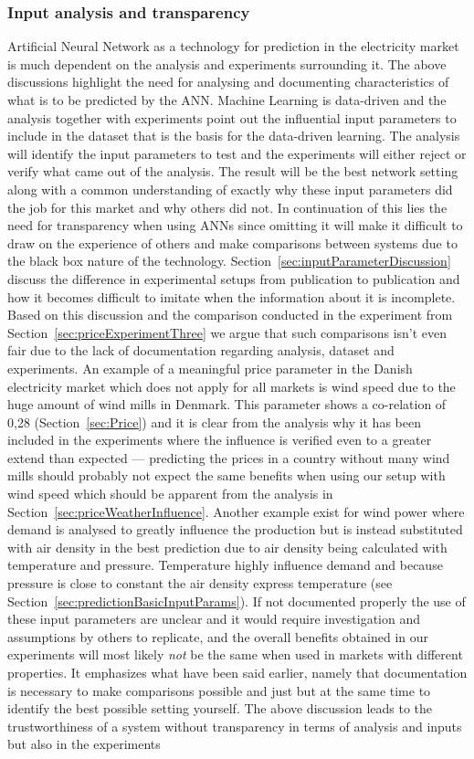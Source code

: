 \subsubsection{Input analysis and transparency}
Artificial Neural Network as a technology for prediction in the electricity market is much dependent on the analysis and experiments surrounding it. The above discussions highlight the need for analysing and documenting characteristics of what is to be predicted by the ANN. Machine Learning is data-driven\cite{18} and the analysis together with experiments point out the influential input parameters to include in the dataset that is the basis for the data-driven learning. The analysis will identify the input parameters to test and the experiments will either reject or verify what came out of the analysis. The result will be the best network setting along with a common understanding of exactly why these input parameters did the job for this market and why others did not. In continuation of this lies the need for transparency when using ANNs since omitting it will make it difficult to draw on the experience of others and make comparisons between systems due to the black box nature of the technology. Section~\ref{sec:inputParameterDiscussion} discuss the difference in experimental setups from publication to publication and how it becomes difficult to imitate when the information about it is incomplete. Based on this discussion and the comparison conducted in the experiment from Section~\ref{sec:priceExperimentThree} we argue that such comparisons isn't even fair due to the lack of documentation regarding analysis, dataset and experiments. An example of a meaningful price parameter in the Danish electricity market which does not apply for all markets is wind speed due to the huge amount of wind mills in Denmark. This parameter shows a co-relation of 0,28 (Section~\ref{sec:Price}) and it is clear from the analysis why it has been included in the experiments where the influence is verified even to a greater extend than expected --- predicting the prices in a country without many wind mills should probably not expect the same benefits when using our setup with wind speed which should be apparent from the analysis in Section~\ref{sec:priceWeatherInfluence}. Another example exist for wind power where demand is analysed to greatly influence the production but is instead substituted with air density in the best prediction due to air density being calculated with temperature and pressure. Temperature highly influence demand and because pressure is close to constant the air density express temperature (see Section~\ref{sec:predictionBasicInputParams}). If not documented properly the use of these input parameters are unclear and it would require investigation and assumptions by others to replicate, and the overall benefits obtained in our experiments will most likely \emph{not} be the same when used in markets with different properties. It emphasizes what have been said earlier, namely that documentation is necessary to make comparisons possible and just but at the same time to identify the best possible setting yourself. The above discussion leads to the trustworthiness of a system without transparency in terms of analysis and inputs but also in the experiments 